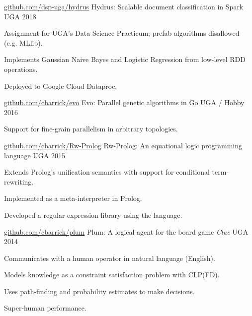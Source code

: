 \begin{cventries}

\cventry
{\textnormal{\url{github.com/dsp-uga/hydrus}}}
{Hydrus: Scalable document classification in Spark}
{UGA}
{2018}
{\begin{cvitems}
    \item {Assignment for UGA's Data Science Practicum; prefab algorithms disallowed (e.g. MLlib).}
    \item {Implements Gaussian Naive Bayes and Logistic Regression from low-level RDD operations.}
    \item {Deployed to Google Cloud Dataproc.}
\end{cvitems}}

\cventry
{\textnormal{\url{github.com/cbarrick/evo}}}
{Evo: Parallel genetic algorithms in Go}
{UGA / Hobby}
{2016}
{\begin{cvitems}
    \item {Support for fine-grain parallelism in arbitrary topologies.}
\end{cvitems}}

\cventry
{\textnormal{\url{github.com/cbarrick/Rw-Prolog}}}
{Rw-Prolog: An equational logic programming language}
{UGA}
{2015}
{\begin{cvitems}
    \item {Extends Prolog's unification semantics with support for conditional term-rewriting.}
    \item {Implemented as a meta-interpreter in Prolog.}
    \item {Developed a regular expression library using the language.}
\end{cvitems}}

\cventry
{\textnormal{\url{github.com/cbarrick/plum}}}
{Plum: A logical agent for the board game \textit{Clue}}
{UGA}
{2014}
{\begin{cvitems}
    \item {Communicates with a human operator in natural language (English).}
    \item {Models knowledge as a constraint satisfaction problem with CLP(FD).}
    \item {Uses path-finding and probability estimates to make decisions.}
    \item {Super-human performance.}
\end{cvitems}}

\end{cventries}
